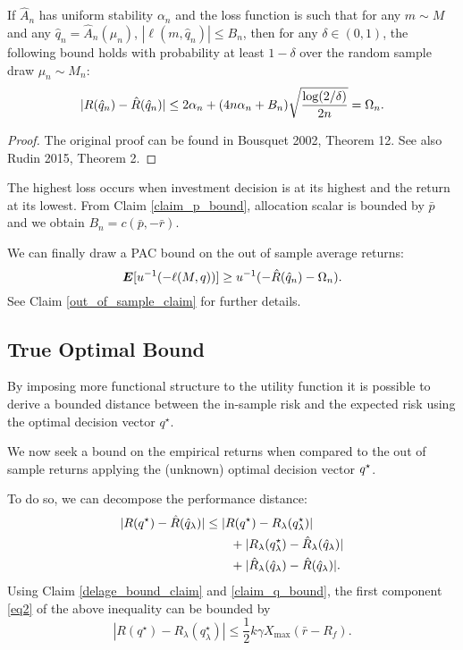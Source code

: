 \documentclass[11pt]{article}
\begin{document}
\begin{thm}
  \label{thm2}
  If $\hat A_n$ has uniform stability $\alpha_n$ and the loss function is such that for
  any $m\sim M$ and any $\hat q_n=\hat A_n(\mu_n)$, $|\ell(m,\hat q_n)|\leq B_n$, then for
  any $\delta\in(0,1)$, the following bound holds with probability at least $1-\delta$
  over the random sample draw $\mu_n\sim M_n$:
  \begin{equation*}
    |R({\hat q}_n) - \hat R({\hat q}_n)| \leq 2\alpha_n + (4n\alpha_n +
    B_n)\sqrt{\frac{\log(2/\delta)}{2n}} = \Omega_n.
  \end{equation*}
\end{thm}

\begin{proof}
  The original proof can be found in Bousquet 2002, Theorem 12. See also Rudin 2015,
  Theorem 2. 
\end{proof}

\begin{rem}
  The highest loss occurs when investment decision is at its highest and the return at its
  lowest. From Claim \ref{claim_p_bound}, allocation scalar is bounded by $\bar p$ and we
  obtain $B_n = c(\bar p, -\bar r)$.
\end{rem}

We can finally draw a PAC bound on the out of sample average returns:
\begin{equation}
  \bm E[u^{-1}(-\ell(M,q))] \geq u^{-1}(-\hat R(\hat q_n) - \Omega_n).
\end{equation}
See Claim \ref{out_of_sample_claim} for further details.
 
\subsection{True Optimal Bound}

By imposing more functional structure to the utility function it is possible to derive a
bounded distance between the in-sample risk and the expected risk using the optimal
decision vector $q^\star$. 

We now seek a bound on the empirical returns when compared to the out of sample returns
applying the (unknown) optimal decision vector ${q^\star}$. 

To do so, we can decompose the performance distance:
\begin{align}
  |R({q^\star}) - \hat R({\hat q}_\lambda)| &\leq |R({q^\star}) - R_\lambda(q^\star_\lambda)|\label{eq2}\\
                                      &\qquad + |R_\lambda(q^\star_\lambda) - \hat R_\lambda(\hat q_\lambda)|\label{eq3}\\
                                      &\qquad + |\hat R_\lambda(\hat q_\lambda) - \hat R(\hat q_\lambda)|\label{eq4}.
\end{align}
Using Claim \ref{delage_bound_claim} and \ref{claim_q_bound}, the first component
\eqref{eq2} of the above inequality can be bounded by
\begin{equation*}
  |R(q^\star) - R_\lambda(q^\star_\lambda)| \leq \frac{1}{2}k\gamma X_{\max}(\bar r-R_f).
\end{equation*}
\end{document}
